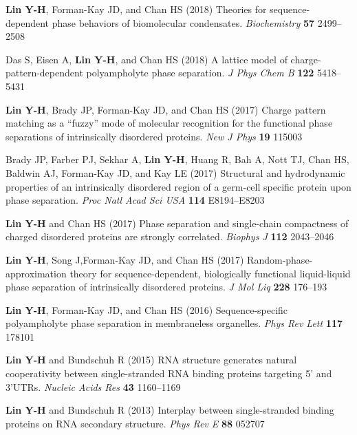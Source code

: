 \documentclass[11pt]{../yhlcv}
\def\tname#1{{\bf #1}}
\begin{document}
\begin{etaremune}[leftmargin=0.26in]
\item
\tname{Lin Y-H}, Forman-Kay JD, and Chan HS (2018)
Theories for sequence-dependent phase behaviors of biomolecular condensates.
{\it Biochemistry} {\bf 57} 2499--2508

\item 
Das S, Eisen A, \tname{Lin Y-H}, and Chan HS (2018)
A lattice model of charge-pattern-dependent polyampholyte phase separation.
{\it J Phys Chem B} {\bf 122} 5418--5431

\item
\tname{Lin Y-H}, Brady JP, Forman-Kay JD, and Chan HS (2017) 
Charge pattern matching as a ``fuzzy'' mode of molecular recognition for the functional phase separations of intrinsically disordered proteins.
{\it New J Phys} {\bf 19} 115003

\item 
Brady JP, Farber PJ, Sekhar A, \tname{Lin Y-H}, Huang R, Bah A, Nott TJ, Chan HS, Baldwin AJ, Forman-Kay JD, and Kay LE (2017) 
Structural and hydrodynamic properties of an intrinsically disordered region of a germ-cell specific protein upon phase separation. 
{\it Proc Natl Acad Sci USA} {\bf 114} E8194--E8203

\item
\tname{Lin Y-H} and Chan HS (2017) 
Phase separation and single-chain compactness of charged disordered proteins are strongly correlated. 
{\it Biophys J} {\bf 112} 2043--2046

\item 
\tname{Lin Y-H}, Song J,Forman-Kay JD, and Chan HS  (2017) 
Random-phase-approximation theory for sequence-dependent, biologically functional liquid-liquid phase separation of intrinsically disordered proteins. 
{\it J Mol Liq} {\bf 228} 176--193

\item
\tname{Lin Y-H}, Forman-Kay JD, and Chan HS (2016) 
Sequence-specific polyampholyte phase separation in membraneless organelles. 
{\it Phys Rev Lett} {\bf 117} 178101

\item 
\tname{Lin Y-H} and Bundschuh R (2015) 
RNA structure generates natural cooperativity between single-stranded RNA binding proteins targeting 5' and 3'UTRs.
{\it Nucleic Acids Res} {\bf 43} 1160--1169

\item 
\tname{Lin Y-H} and Bundschuh R (2013) 
Interplay between single-stranded binding proteins on RNA secondary structure.
{\it Phys Rev E} {\bf 88} 052707


\end{etaremune} 
\end{document}

